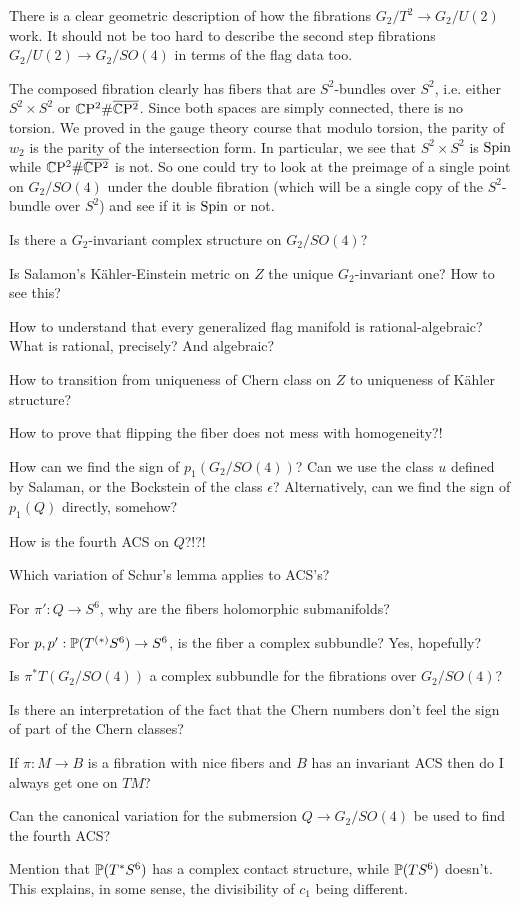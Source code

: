 \documentclass{scrartcl}
\begin{document}
\begin{numberedlist}
	\item There is a clear geometric description of how the fibrations $G_2/T^2\to G_2/U(2)$ work. It should not be too hard to describe the second step fibrations $G_2/U(2)\to G_2/SO(4)$ in terms of the flag data too.
	\item The composed fibration clearly has fibers that are $S^2$-bundles over $S^2$, i.e. either $S^2\times S^2$ or $\CP^2\#\overline{\CP^2}$. Since both spaces are simply connected, there is no torsion. We proved in the gauge theory course that modulo torsion, the parity of $w_2$ is the parity of the intersection form. In particular, we see that $S^2\times S^2$ is $\Spin$ while $\CP^2\#\overline{\CP^2}$ is not. So one could try to look at the preimage of a single point on $G_2/SO(4)$ under the double fibration (which will be a single copy of the $S^2$-bundle over $S^2$) and see if it is $\Spin$ or not.
	\item Is there a $G_2$-invariant complex structure on $G_2/SO(4)$?
	\item Is Salamon's K\"ahler-Einstein metric on $Z$ the unique $G_2$-invariant one? How to see this?
	\item How to understand that every generalized flag manifold is rational-algebraic? What is rational, precisely? And algebraic?
	\item How to transition from uniqueness of Chern class on $Z$ to uniqueness of K\"ahler structure?
	\item How to prove that flipping the fiber does not mess with homogeneity?!
	\item How can we find the sign of $p_1(G_2/SO(4))$? Can we use the class $u$ defined by Salaman, or the Bockstein of the class $\epsilon$? Alternatively, can we find the sign of $p_1(Q)$ directly, somehow?
	\item How is the fourth ACS on $Q$?!?!
	\item Which variation of Schur's lemma applies to ACS's?
	\item For $\pi':Q\to S^6$, why are the fibers holomorphic submanifolds?
	\item For $p,p':\P(T^{(*)}S^6)\to S^6$, is the fiber a complex subbundle? Yes, hopefully?
	\item Is $\pi^*T(G_2/SO(4))$ a complex subbundle for the fibrations over $G_2/SO(4)$?
	\item Is there an interpretation of the fact that the Chern numbers don't feel the sign of part of the Chern classes?
	\item If $\pi:M\to B$ is a fibration with nice fibers and $B$ has an invariant ACS then do I always get one on $TM$?
	\item Can the canonical variation for the submersion $Q\to G_2/SO(4)$ be used to find the fourth ACS?
	\item Mention that $\P(T^*S^6)$ has a complex contact structure, while $\P(TS^6)$ doesn't. This explains, in some sense, the divisibility of $c_1$ being different.
\end{numberedlist}
\end{document}

